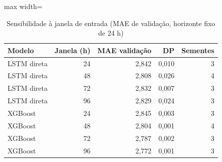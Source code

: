 \begin{table}[!htbp]
    \centering
    \caption{Sensibilidade à janela de entrada (MAE de validação, horizonte fixo de 24 h)}
    \label{tab:janela_validacao}
    \small
    \begin{adjustbox}{max width=\textwidth}
    \begin{tabular}{lrrrr}
        \toprule
        Modelo & Janela (h) & MAE validação & DP & Sementes \\
        \midrule
        LSTM direta & 24 & 2,842 & 0,010 & 3 \\
        LSTM direta & 48 & 2,808 & 0,026 & 4 \\
        LSTM direta & 72 & 2,832 & 0,007 & 3 \\
        LSTM direta & 96 & 2,829 & 0,024 & 3 \\
        XGBoost & 24 & 2,845 & 0,003 & 3 \\
        XGBoost & 48 & 2,804 & 0,001 & 4 \\
        XGBoost & 72 & 2,787 & 0,002 & 3 \\
        XGBoost & 96 & 2,772 & 0,001 & 3 \\
        \bottomrule
    \end{tabular}
    \end{adjustbox}
\end{table}
